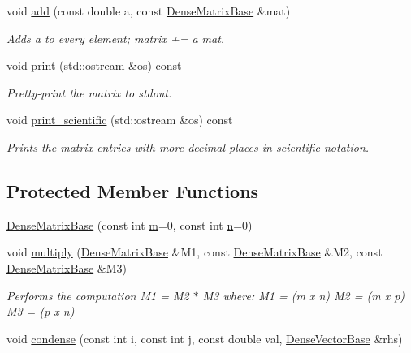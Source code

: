 \begin{DoxyCompactItemize}
void \mbox{\hyperlink{classfemus_1_1_dense_matrix_base_a277ec615714cd55ae4a7a8d897915ed2}{add}} (const double a, const \mbox{\hyperlink{classfemus_1_1_dense_matrix_base}{Dense\+Matrix\+Base}} \&mat)
\begin{DoxyCompactList}\small\item\em Adds {\ttfamily a} to every element; matrix += a mat. \end{DoxyCompactList}\item 
void \mbox{\hyperlink{classfemus_1_1_dense_matrix_base_a90e8d872f96927e0ad2b6ec0230446e7}{print}} (std\+::ostream \&os) const
\begin{DoxyCompactList}\small\item\em Pretty-\/print the matrix to {\ttfamily stdout}. \end{DoxyCompactList}\item 
void \mbox{\hyperlink{classfemus_1_1_dense_matrix_base_a9124c00c4f77e51655d3efe02c00977f}{print\+\_\+scientific}} (std\+::ostream \&os) const
\begin{DoxyCompactList}\small\item\em Prints the matrix entries with more decimal places in scientific notation. \end{DoxyCompactList}\end{DoxyCompactItemize}
\subsection*{Protected Member Functions}
\begin{DoxyCompactItemize}
\item 
\mbox{\hyperlink{classfemus_1_1_dense_matrix_base_a8e75c57265e5e286b794a0bbd48dd356}{Dense\+Matrix\+Base}} (const int \mbox{\hyperlink{classfemus_1_1_dense_matrix_base_a67a582a53ab5ce7628a53f6a90fd39b9}{m}}=0, const int \mbox{\hyperlink{classfemus_1_1_dense_matrix_base_a1d9b513340794a8b15640f9c8cc6597e}{n}}=0)
\item 
void \mbox{\hyperlink{classfemus_1_1_dense_matrix_base_a57b42c9b3424afaf5203348d816e25d9}{multiply}} (\mbox{\hyperlink{classfemus_1_1_dense_matrix_base}{Dense\+Matrix\+Base}} \&M1, const \mbox{\hyperlink{classfemus_1_1_dense_matrix_base}{Dense\+Matrix\+Base}} \&M2, const \mbox{\hyperlink{classfemus_1_1_dense_matrix_base}{Dense\+Matrix\+Base}} \&M3)
\begin{DoxyCompactList}\small\item\em Performs the computation M1 = M2 $\ast$ M3 where\+: M1 = (m x n) M2 = (m x p) M3 = (p x n) \end{DoxyCompactList}\item 
void \mbox{\hyperlink{classfemus_1_1_dense_matrix_base_af0dafc872890045e08a93f40fbc9b442}{condense}} (const int i, const int j, const double val, \mbox{\hyperlink{classfemus_1_1_dense_vector_base}{Dense\+Vector\+Base}} \&rhs)
\end{DoxyCompactItemize}
